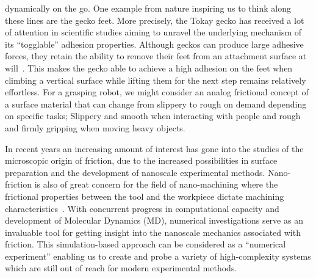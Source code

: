 dynamically on the go. One example from nature inspiring us to think along
these lines are the gecko feet. More precisely, the Tokay gecko has received a
lot of attention in scientific studies aiming to unravel the underlying
mechanism of its ``togglable'' adhesion properties. Although geckos can
produce large adhesive forces, they retain the ability to remove their feet from
an attachment surface at will~\cite{Gekko}. This makes the gecko able to achieve a high adhesion on the feet when climbing a vertical surface while lifting them for the next step remains relatively effortless. For a grasping robot, we might
consider an analog frictional concept of a surface material that can change from
slippery to rough on demand depending on specific tasks; Slippery and smooth when interacting with people and rough and firmly gripping when moving heavy objects.


In recent years an increasing amount of interest has gone into the studies of
the microscopic origin of friction, due to the increased possibilities in
surface preparation and the development of nanoscale experimental methods.
Nano-friction is also of great concern for the field of nano-machining where the
frictional properties between the tool and the workpiece dictate machining
characteristics~\cite{kim_nano-scale_2009}. With concurrent progress in
computational capacity and development of Molecular Dynamics (\acrshort{MD}),
numerical investigations serve as an invaluable tool for getting insight into
the nanoscale mechanics associated with friction. This simulation-based approach
can be considered as a ``numerical experiment'' enabling us to create and probe
a variety of high-complexity systems which are still out of reach for modern
experimental methods.

